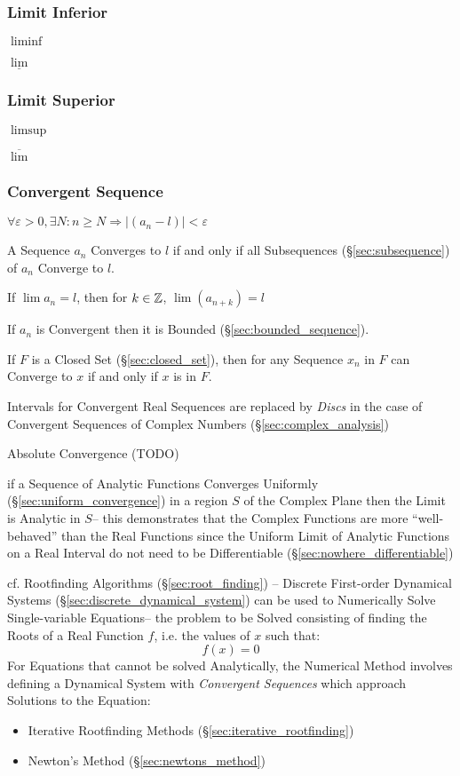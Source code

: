 \subsubsection{Limit Inferior}\label{sec:liminf}

$\liminf$

$\underline{\lim}$



\subsubsection{Limit Superior}\label{sec:limsup}

$\limsup$

$\overline{\lim}$



\subsubsection{Convergent Sequence}\label{sec:convergent_sequence}

$\forall \varepsilon > 0, \exists N : n \geq N \Rightarrow |(a_n - l)| <
\varepsilon$

A Sequence $a_n$ Converges to $l$ if and only if all Subsequences
(\S\ref{sec:subsequence}) of $a_n$ Converge to $l$.

If $\lim a_n = l$, then for $k \in \mathbb{Z}$, $\lim (a_{n+k}) = l$

If $a_n$ is Convergent then it is Bounded
(\S\ref{sec:bounded_sequence}).

If $F$ is a Closed Set (\S\ref{sec:closed_set}), then for any Sequence
$x_n$ in $F$ can Converge to $x$ if and only if $x$ is in $F$.

Intervals for Convergent Real Sequences are replaced by \emph{Discs} in the
case of Convergent Sequences of Complex Numbers (\S\ref{sec:complex_analysis})

Absolute Convergence (TODO)

if a Sequence of Analytic Functions Converges Uniformly
(\S\ref{sec:uniform_convergence}) in a region $S$ of the Complex Plane then the
Limit is Analytic in $S$-- this demonstrates that the Complex Functions are
more ``well-behaved'' than the Real Functions since the Uniform Limit of
Analytic Functions on a Real Interval do not need to be Differentiable
(\S\ref{sec:nowhere_differentiable})

\fist cf. Rootfinding Algorithms (\S\ref{sec:root_finding}) -- Discrete
First-order Dynamical Systems (\S\ref{sec:discrete_dynamical_system}) can be
used to Numerically Solve Single-variable Equations-- the problem to be Solved
consisting of finding the Roots of a Real Function $f$, i.e. the values of $x$
such that:
\[
  f(x) = 0
\]
For Equations that cannot be solved Analytically, the Numerical Method involves
defining a Dynamical System with \emph{Convergent Sequences} which approach
Solutions to the Equation:
\begin{itemize}
  \item Iterative Rootfinding Methods (\S\ref{sec:iterative_rootfinding})
  \item Newton's Method (\S\ref{sec:newtons_method})
\end{itemize}



